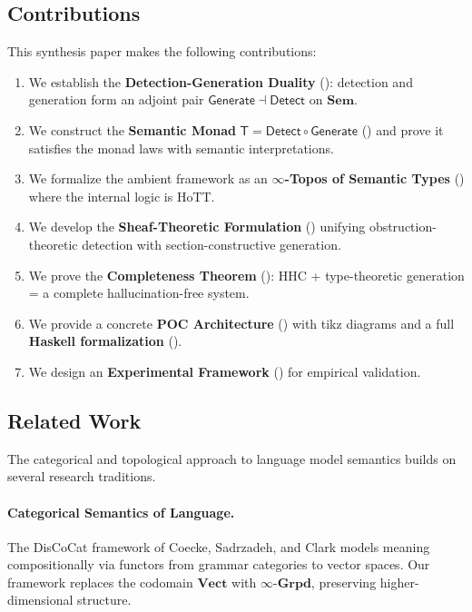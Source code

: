 \documentclass[11pt,a4paper]{article}
\theoremstyle{plain}
\theoremstyle{definition}
\theoremstyle{remark}
\newcommand{\Sem}{\mathbf{Sem}}
\newcommand{\Vect}{\mathbf{Vect}}
\newcommand{\Grpd}{\boldsymbol{\infty}\text{-}\mathbf{Grpd}}
\newcommand{\Detect}{\mathsf{Detect}}
\newcommand{\Generate}{\mathsf{Generate}}
\newcommand{\SemanticT}{\mathsf{T}}
\begin{document}
\subsection{Contributions}

This synthesis paper makes the following contributions:

\begin{enumerate}[leftmargin=*,nosep]
  \item We establish the \textbf{Detection-Generation Duality} (): detection and generation form an adjoint pair $\Generate \dashv \Detect$ on $\Sem$.
  \item We construct the \textbf{Semantic Monad} $\SemanticT = \Detect \circ \Generate$ () and prove it satisfies the monad laws with semantic interpretations.
  \item We formalize the ambient framework as an \textbf{$\infty$-Topos of Semantic Types} () where the internal logic is HoTT.
  \item We develop the \textbf{Sheaf-Theoretic Formulation} () unifying obstruction-theoretic detection with section-constructive generation.
  \item We prove the \textbf{Completeness Theorem} (): HHC + type-theoretic generation = a complete hallucination-free system.
  \item We provide a concrete \textbf{POC Architecture} () with tikz diagrams and a full \textbf{Haskell formalization} ().
  \item We design an \textbf{Experimental Framework} () for empirical validation.
\end{enumerate}

\subsection{Related Work}

The categorical and topological approach to language model semantics builds on several research traditions.

\paragraph{Categorical Semantics of Language.} The DisCoCat framework of Coecke, Sadrzadeh, and Clark \cite{coecke2010mathematical} models meaning compositionally via functors from grammar categories to vector spaces. Our framework replaces the codomain $\Vect$ with $\Grpd$, preserving higher-dimensional structure.
\end{document}
